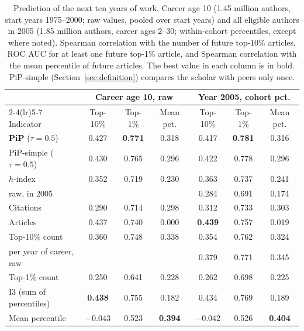 \documentclass[11pt]{article}
\begin{document}
\begin{table}[t]
  \centering
  \small
  \begin{threeparttable}
  \caption{Prediction of the next ten years of work. Career age 10 (1.45 million authors, start years 1975--2000; raw
  values, pooled over start years) and all eligible authors in 2005 (1.85 million authors, career ages 2--30;
  within-cohort percentiles, except where noted). Spearman correlation with the number of future top-10\% articles, ROC
  AUC for at least one future top-1\% article, and Spearman correlation with the mean percentile of future articles. The
  best value in each column is in bold. PiP-simple (Section~\ref{sec:definition}) compares the scholar with peers only
  once.}
  \label{tab:prediction}
  \begin{tabular}{lcccccc}
    \toprule
    & \multicolumn{3}{c}{Career age 10, raw} & \multicolumn{3}{c}{Year 2005, cohort pct.} \\
    \cmidrule(lr){2-4}\cmidrule(lr){5-7}
    Indicator & Top-10\% & Top-1\% & Mean pct. & Top-10\% & Top-1\% & Mean pct. \\
    \midrule
    \textbf{PiP} ($\tau = 0.5$) & 0.427 & \textbf{0.771} & 0.318 & 0.417 & \textbf{0.781} & 0.316 \\
    \quad PiP-simple ($\tau = 0.5$) & 0.430 & 0.765 & 0.296 & 0.422 & 0.778 & 0.296 \\
    \addlinespace
    $h$-index & 0.352 & 0.719 & 0.230 & 0.363 & 0.737 & 0.241 \\
    \quad raw, in 2005 & & & & 0.284 & 0.691 & 0.174 \\
    Citations & 0.290 & 0.714 & 0.298 & 0.312 & 0.733 & 0.303 \\
    Articles & 0.437 & 0.740 & 0.000 & \textbf{0.439} & 0.757 & 0.019 \\
    \addlinespace
    Top-10\% count & 0.360 & 0.748 & 0.338 & 0.354 & 0.762 & 0.324 \\
    \quad per year of career, raw & & & & 0.379 & 0.771 & 0.345 \\
    Top-1\% count & 0.250 & 0.641 & 0.228 & 0.262 & 0.698 & 0.225 \\
    I3 (sum of percentiles) & \textbf{0.438} & 0.755 & 0.182 & 0.434 & 0.769 & 0.189 \\
    Mean percentile & $-0.043$ & 0.523 & \textbf{0.394} & $-0.042$ & 0.526 & \textbf{0.404} \\
    \bottomrule
  \end{tabular}
  \end{threeparttable}
\end{table}
\end{document}
